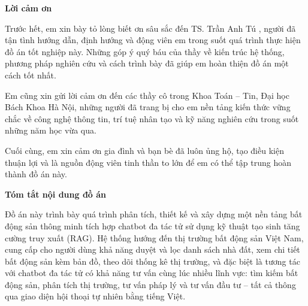 \thispagestyle{empty}

\begin{center}
    {\fontsize{13}{16}\selectfont\bfseries Lời cảm ơn}
\end{center}

Trước hết, em xin bày tỏ lòng biết ơn sâu sắc đến TS. Trần Anh Tú , người đã tận tình hướng dẫn, định hướng và động viên em trong suốt quá trình thực hiện đồ án tốt nghiệp này. Những góp ý quý báu của thầy về kiến trúc hệ thống, phương pháp nghiên cứu và cách trình bày đã giúp em hoàn thiện đồ án một cách tốt nhất.

Em cũng xin gửi lời cảm ơn đến các thầy cô trong Khoa Toán -- Tin, Đại học Bách Khoa Hà Nội, những người đã trang bị cho em nền tảng kiến thức vững chắc về công nghệ thông tin, trí tuệ nhân tạo và kỹ năng nghiên cứu trong suốt những năm học vừa qua.

Cuối cùng, em xin cảm ơn gia đình và bạn bè đã luôn ủng hộ, tạo điều kiện thuận lợi và là nguồn động viên tinh thần to lớn để em có thể tập trung hoàn thành đồ án này.

\vspace{1cm}

\begin{center}
    {\fontsize{13}{16}\selectfont\bfseries Tóm tắt nội dung đồ án}
\end{center}


Đồ án này trình bày quá trình phân tích, thiết kế và xây dựng một nền tảng bất động sản thông minh tích hợp chatbot đa tác tử sử dụng kỹ thuật tạo sinh tăng cường truy xuất (RAG). Hệ thống hướng đến thị trường bất động sản Việt Nam, cung cấp cho người dùng khả năng duyệt và lọc danh sách nhà đất, xem chi tiết bất động sản kèm bản đồ, theo dõi thống kê thị trường, và đặc biệt là tương tác với chatbot đa tác tử có khả năng tư vấn cùng lúc nhiều lĩnh vực: tìm kiếm bất động sản, phân tích thị trường, tư vấn pháp lý và tư vấn đầu tư -- tất cả thông qua giao diện hội thoại tự nhiên bằng tiếng Việt.

